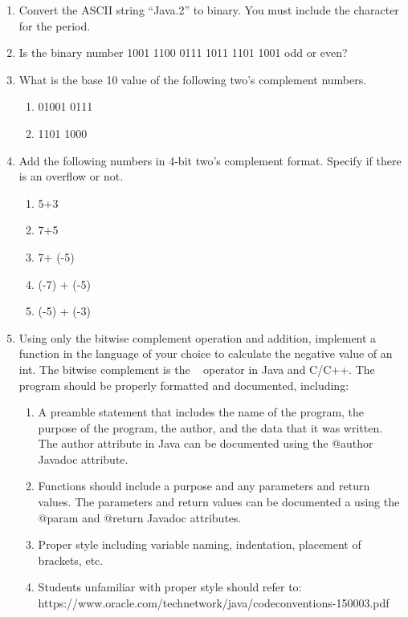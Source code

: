 \documentclass[12pt]{article}
\newcommand{\perhapsanswer}{%
  \ifanswer
    $\blacksquare$ \global\answerfalse
  \else
    $\square$ \global\answerfalse
  \fi
}
\newif\ifanswer
\begin{document}
\begin{enumerate}
    \item Convert the ASCII string “Java.2” to binary. You must include the character for the period.

    \item Is the binary number 1001 1100 0111 1011 1101 1001 odd or even?

    \item What is the base 10 value of the following two’s complement numbers.
    \begin{enumerate}
      \item 01001 0111
      \item 1101 1000
    \end{enumerate}

    \item Add the following numbers in 4-bit two’s complement format. Specify if there is an overflow or not.
    \begin{enumerate}
      \item 5+3
      \item 7+5
      \item 7+ (-5)
      \item (-7) + (-5)
      \item (-5) + (-3)
    \end{enumerate}

    \item Using only the bitwise complement operation and addition, implement a function in the language of your choice to calculate the negative value of an int. The bitwise complement is the ~ operator in Java and C/C++. The program should be properly formatted and documented, including:
    \begin{enumerate}[start=1,align=left,label={\protect\perhapsanswer(\alph*)}]
      \item A preamble statement that includes the name of the program, the purpose of the program, the author, and the data that it was written. The author attribute in Java can be documented using the @author Javadoc attribute.
      \item Functions should include a purpose and any parameters and return values. The parameters and return values can be documented a using the @param and @return Javadoc attributes.
      \item Proper style including variable naming, indentation, placement of brackets, etc.
      \item Students unfamiliar with proper style should refer to: https://www.oracle.com/technetwork/java/codeconventions-150003.pdf
    \end{enumerate}


\end{enumerate}
\end{document}
